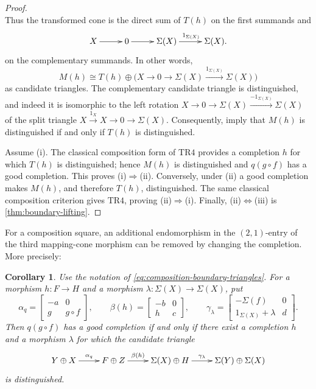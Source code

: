 \documentclass[a4paper,11pt,reqno]{amsart}
\newtheorem{corollary}[corollary]{Corollary}
\theoremstyle{definition}
\theoremstyle{plain}
\numberwithin{equation}{section}
\begin{document}
\begin{proof}
\[\]
Thus the transformed cone is the direct sum of
$T(h)$ on the first summands and
\begin{equation*}
\xymatrix@C=2.2pc{
X\ar[r]&0\ar[r]&\Sigma(X)\ar[r]^{1_{\Sigma(X)}}&\Sigma(X).
}
\end{equation*}
on the complementary summands.  In other words,
\[
 M(h)\cong T(h)\oplus
 \bigl(X\to0\to\Sigma(X)\xrightarrow{1_{\Sigma(X)}}\Sigma(X)\bigr)
\]
as candidate triangles.  The complementary candidate triangle is distinguished, and
indeed it is isomorphic to the left rotation
$X\to0\to\Sigma(X)\xrightarrow{-1_{\Sigma(X)}}\Sigma(X)$ of the split
triangle $X\xrightarrow{1_X}X\to0\to\Sigma(X)$.
Consequently,
\cite[Propositions~1.2.1 and~1.2.3]{Neeman2001} imply that $M(h)$ is
distinguished if and only if $T(h)$ is distinguished.

Assume \textup{(i)}.  The classical composition form of $\mathrm{TR4}$
provides a completion $h$ for which $T(h)$ is distinguished; hence $M(h)$
is distinguished and $q(g\circ f)$ has a good completion.  This proves
\textup{(i)}$\Rightarrow$\textup{(ii)}.  Conversely, under \textup{(ii)} a
good completion makes $M(h)$, and therefore $T(h)$, distinguished.  The
same classical composition criterion gives $\mathrm{TR4}$, proving
\textup{(ii)}$\Rightarrow$\textup{(i)}.  Finally,
\textup{(ii)}$\Leftrightarrow$\textup{(iii)} is
\cref{thm:boundary-lifting}.
\end{proof}

For a composition square, an additional endomorphism in the $(2,1)$-entry
of the third mapping-cone morphism can be removed by changing the completion.
More precisely:

\begin{corollary}
\label{cor:cone-shear-removal}
Use the notation of \eqref{eq:composition-boundary-triangles}.  For a
morphism \(h:F\to H\) and a morphism
\(\lambda:\Sigma(X)\to\Sigma(X)\), put
\[
 \alpha_q=
 \begin{bmatrix}-a&0\\g&g\circ f\end{bmatrix},\qquad
 \beta(h)=
 \begin{bmatrix}-b&0\\h&c\end{bmatrix},\qquad
 \gamma_\lambda=
 \begin{bmatrix}-\Sigma(f)&0\\1_{\Sigma(X)}+\lambda&d\end{bmatrix}.
\]
Then \(q(g\circ f)\) has a good completion if and only if there exist a
completion \(h\) and a morphism \(\lambda\) for which the candidate triangle
\begin{equation}
\label{eq:lower-left-sheared-cone}
\xymatrix@C=2.0pc{
Y\oplus X\ar[r]^-{\alpha_q}&F\oplus Z\ar[r]^-{\beta(h)}&
\Sigma(X)\oplus H\ar[r]^-{\gamma_\lambda}&
\Sigma(Y)\oplus\Sigma(X)
}
\end{equation}
is distinguished.
\end{corollary}
\end{document}
